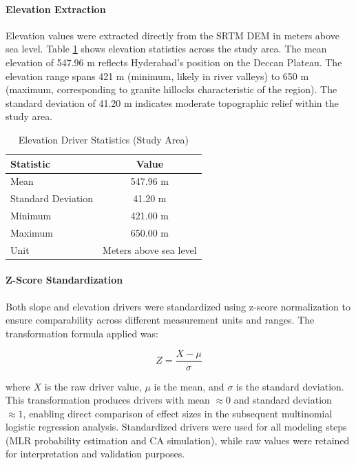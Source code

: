 \documentclass[12pt,a4paper]{article}
\begin{document}
\paragraph{Elevation Extraction}
Elevation values were extracted directly from the SRTM DEM in meters above sea level. Table \ref{tab:elevation_stats} shows elevation statistics across the study area. The mean elevation of 547.96 m reflects Hyderabad's position on the Deccan Plateau. The elevation range spans 421 m (minimum, likely in river valleys) to 650 m (maximum, corresponding to granite hillocks characteristic of the region). The standard deviation of 41.20 m indicates moderate topographic relief within the study area.

\begin{table}[H]
\caption{Elevation Driver Statistics (Study Area)}
\label{tab:elevation_stats}
\centering
\small
\begin{tabular}{lc}
\toprule
\textbf{Statistic} & \textbf{Value} \\
\midrule
Mean & 547.96 m \\
Standard Deviation & 41.20 m \\
Minimum & 421.00 m \\
Maximum & 650.00 m \\
Unit & Meters above sea level \\
\bottomrule
\end{tabular}
\end{table}

\paragraph{Z-Score Standardization}
Both slope and elevation drivers were standardized using z-score normalization to ensure comparability across different measurement units and ranges. The transformation formula applied was:

\begin{equation}
Z = \frac{X - \mu}{\sigma}
\label{eq:zscore}
\end{equation}

where $X$ is the raw driver value, $\mu$ is the mean, and $\sigma$ is the standard deviation. This transformation produces drivers with mean $\approx 0$ and standard deviation $\approx 1$, enabling direct comparison of effect sizes in the subsequent multinomial logistic regression analysis. Standardized drivers were used for all modeling steps (MLR probability estimation and CA simulation), while raw values were retained for interpretation and validation purposes.
\end{document}
